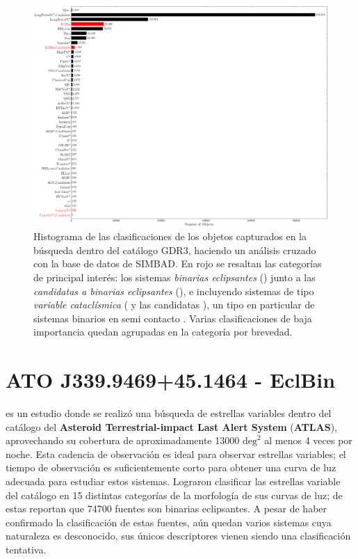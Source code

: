 \begin{figure}[!ht]
	\centering
	\includegraphics[scale=0.4]{Muestra/Secciones/Figures/Figura Gaia SIMBAD Busqueda Resultados.png}
	\caption{Histograma de las clasificaciones de los objetos capturados en la
	búsqueda dentro del catálogo GDR3, haciendo un análisis cruzado con la base
	de datos de SIMBAD. En rojo se resaltan las categorías de principal interés:
	los sistemas \textit{binarias eclipsantes} () junto a las
	\textit{candidatas a binarias eclipsantes} (), e
	incluyendo sistemas de tipo \textit{variable cataclísmica} (
	y las candidatas ), un tipo en particular de
	sistemas binarios en semi contacto
	. Varias
	clasificaciones de baja importancia quedan agrupadas en la categoría
	 por brevedad.}
	\label{figuraBusquedaSimbadHistograma}
\end{figure}

\section{ATO J339.9469+45.1464 - EclBin}

 es un estudio donde se realizó una búsqueda de
estrellas variables dentro del catálogo del \textbf{Asteroid Terrestrial-impact
Last Alert System} (\textbf{ATLAS}), aprovechando su cobertura de
aproximadamente \num{13000} $\mathrm{deg}^2$ al menos 4 veces por noche. Esta
cadencia de observación es ideal para observar estrellas variables; el tiempo de
observación es suficientemente corto para obtener una curva de luz adecuada para
estudiar estos sistemas. Lograron clasificar las estrellas variable del catálogo
en 15 distintas categorías de la morfología de sus curvas de luz; de estas
reportan que \num{74700} fuentes son binarias eclipsantes. A pesar de haber
confirmado la clasificación de estas fuentes, aún quedan varios sistemas cuya
naturaleza es desconocido, sus únicos descriptores vienen siendo una
clasificación tentativa.

